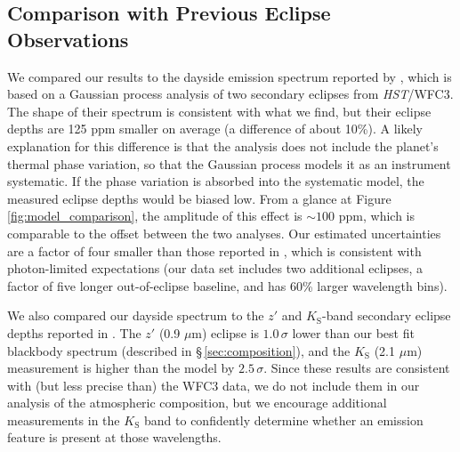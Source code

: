 \documentclass[twocolumn, trackchanges]{aastex61}
\newcommand{\project}[1]{\textsl{#1}}
\newcommand{\HST}{\project{HST}}
\begin{document}
\subsection{Comparison with Previous Eclipse Observations}
We compared our results to the dayside emission spectrum reported by \cite{cartier17}, which is based on a Gaussian process analysis of two secondary eclipses from \HST/WFC3. The shape of their spectrum is consistent with what we find, but their eclipse depths are 125 ppm smaller on average (a difference of about 10\%). A likely explanation for this difference is that the \cite{cartier17} analysis does not include the planet's thermal phase variation, so that the Gaussian process models it as an instrument systematic.  If the phase variation is absorbed into the systematic model, the measured eclipse depths would be biased low.  From a glance at Figure\,\ref{fig:model_comparison}, the amplitude of this effect is $\sim100$ ppm, which is comparable to the offset between the two analyses. Our estimated uncertainties are a factor of four smaller than those reported in \cite{cartier17}, which is consistent with photon-limited expectations (our data set includes two additional eclipses, a factor of five longer out-of-eclipse baseline, and has 60\% larger wavelength bins).


We also compared our dayside spectrum to the $z'$ and $K_\mathrm{S}$-band secondary eclipse depths reported in \cite{delrez18}. The $z'$ (0.9 $\mu$m) eclipse is $1.0\,\sigma$ lower than our best fit blackbody spectrum (described in \S\,\ref{sec:composition}), and the $K_\mathrm{S}$ (2.1 $\mu$m) measurement is higher than the model by $2.5\,\sigma$. Since these results are consistent with (but less precise than) the WFC3 data, we do not include them in our analysis of the atmospheric composition, but we encourage additional measurements in the $K_\mathrm{S}$ band to confidently determine whether an emission feature is present at those wavelengths.
\end{document}
